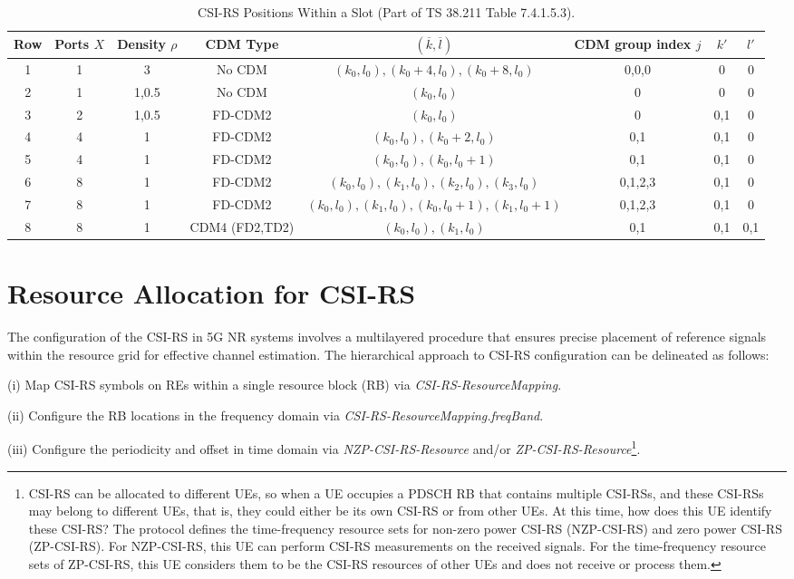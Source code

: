 \documentclass[lettersize,journal]{IEEEtran}
\begin{document}
\begin{appendices}
\begin{table}[t]  
\centering   
\captionsetup{
  labelsep=newline, %
}
\renewcommand{\arraystretch}{1.5}  %
\caption{CSI-RS Positions Within a Slot (Part of TS 38.211 Table 7.4.1.5.3).}  \label{tabcdm}
\begin{tabular}{|c|c|c|c|c|c|c|c|}   
\hline  
\textbf{Row} &\textbf{Ports}  $X$& \textbf{Density $\rho$} & \textbf{CDM Type} & \textbf{$(\overline{k},\overline{l})$} & \textbf{CDM group  index $j$} & \textbf{$k'$} & \textbf{$l'$}\\
\hline   
1 & 1 &3& No CDM &$(k_0,l_0),(k_0+4,l_0),(k_0+8,l_0)$ &0,0,0 & 0 & 0 \\
\hline
2 & 1 &1,0.5 &No CDM &$(k_0,l_0)$ &0& 0 & 0 \\
\hline
3 & 2 &1,0.5 &FD-CDM2 &$(k_0,l_0)$ &0& 0,1 & 0 \\
\hline
4 & 4 &1& FD-CDM2 &$(k_0,l_0),(k_0+2,l_0)$ &0,1& 0,1 & 0 \\
\hline
5 & 4 &1 &FD-CDM2 &$(k_0,l_0),(k_0,l_0+1)$ &0,1 & 0,1 & 0 \\
\hline
6 & 8 &1& FD-CDM2 &$(k_0,l_0),(k_1,l_0),(k_2,l_0),(k_3,l_0)$ &0,1,2,3 & 0,1 & 0 \\
\hline
7 & 8 &1 &FD-CDM2 &$(k_0,l_0),(k_1,l_0),(k_0,l_0+1),(k_1,l_0+1)$ &0,1,2,3 & 0,1 & 0 \\
\hline
8 & 8 &1& CDM4 (FD2,TD2) &$(k_0,l_0),(k_1,l_0)$ &0,1 & 0,1 & 0,1 \\
\hline 
\end{tabular}   
\end{table} 




\section{Resource Allocation for CSI-RS}\label{resource}
The configuration of the CSI-RS in 5G NR systems involves a multilayered procedure that ensures precise placement of reference signals within the resource grid for effective channel estimation. The hierarchical approach to CSI-RS configuration can be delineated as follows:

(i)  Map CSI-RS symbols on REs within a single resource block (RB) via \emph{CSI-RS-ResourceMapping}.

(ii) Configure the RB locations in the frequency domain via \emph{CSI-RS-ResourceMapping.freqBand}.

(iii) Configure the periodicity and offset in time domain via  \emph{NZP-CSI-RS-Resource} and/or \emph{ZP-CSI-RS-Resource}{\footnote{CSI-RS can be allocated to different UEs, so when a UE occupies a PDSCH RB that contains multiple CSI-RSs, and these CSI-RSs may belong to different UEs, that is, they could either be its own CSI-RS or from other UEs. At this time, how does this UE identify these CSI-RS? The protocol defines the time-frequency resource sets for non-zero power CSI-RS (NZP-CSI-RS) and zero power CSI-RS (ZP-CSI-RS). For NZP-CSI-RS, this UE can perform CSI-RS measurements on the received signals. For the time-frequency resource sets of ZP-CSI-RS, this UE considers them to be the CSI-RS resources of other UEs and does not receive or process them.}}.


\end{appendices}
\end{document}
